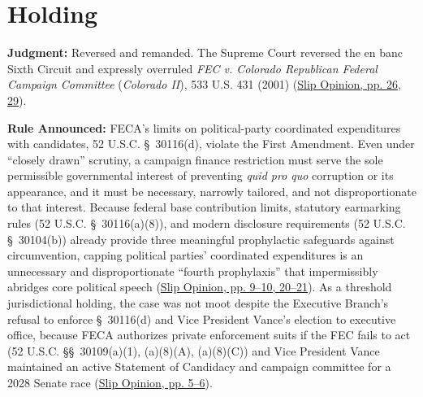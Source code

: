 \documentclass[12pt]{article}
\begin{document}
\section{Holding}
\textbf{Judgment:} Reversed and remanded. The Supreme Court reversed the en banc Sixth Circuit and expressly overruled \textit{FEC v. Colorado Republican Federal Campaign Committee} (\textit{Colorado II}), 533 U.S. 431 (2001) (\href{https://www.supremecourt.gov/opinions/25pdf/24-621_h315.pdf}{Slip Opinion, pp. 26, 29}).

\textbf{Rule Announced:} FECA's limits on political-party coordinated expenditures with candidates, 52 U.S.C. \S~30116(d), violate the First Amendment. Even under ``closely drawn'' scrutiny, a campaign finance restriction must serve the sole permissible governmental interest of preventing \textit{quid pro quo} corruption or its appearance, and it must be necessary, narrowly tailored, and not disproportionate to that interest. Because federal base contribution limits, statutory earmarking rules (52 U.S.C. \S~30116(a)(8)), and modern disclosure requirements (52 U.S.C. \S~30104(b)) already provide three meaningful prophylactic safeguards against circumvention, capping political parties' coordinated expenditures is an unnecessary and disproportionate ``fourth prophylaxis'' that impermissibly abridges core political speech (\href{https://www.supremecourt.gov/opinions/25pdf/24-621_h315.pdf}{Slip Opinion, pp. 9--10, 20--21}). As a threshold jurisdictional holding, the case was not moot despite the Executive Branch's refusal to enforce \S~30116(d) and Vice President Vance's election to executive office, because FECA authorizes private enforcement suits if the FEC fails to act (52 U.S.C. \S\S~30109(a)(1), (a)(8)(A), (a)(8)(C)) and Vice President Vance maintained an active Statement of Candidacy and campaign committee for a 2028 Senate race (\href{https://www.supremecourt.gov/opinions/25pdf/24-621_h315.pdf}{Slip Opinion, pp. 5--6}).
\end{document}
